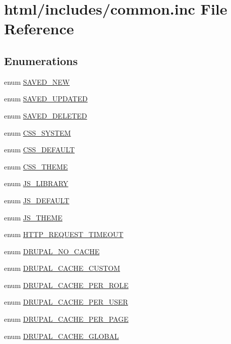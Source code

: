 \hypertarget{common_8inc}{
\section{html/includes/common.inc File Reference}
\label{common_8inc}
}
\subsection*{Enumerations}
\begin{DoxyCompactItemize}
\item 
enum \hyperlink{common_8inc_a7d54df6ca81759341e08f451d4f6c8cd}{SAVED\_\-NEW} 
\item 
enum \hyperlink{common_8inc_a7daf0b68ef3b54562e9999ef017e28cb}{SAVED\_\-UPDATED} 
\item 
enum \hyperlink{common_8inc_a38f401ae5a8d3c2f0a06307fa001fff5}{SAVED\_\-DELETED} 
\item 
enum \hyperlink{common_8inc_a4dcd70075399bbddb625fd93fa479e7f}{CSS\_\-SYSTEM} 
\item 
enum \hyperlink{common_8inc_a6b8a843e5b9b3501472dc6efef34f36b}{CSS\_\-DEFAULT} 
\item 
enum \hyperlink{common_8inc_ad9e230079d79c5c4affbd4ce0b64b7d7}{CSS\_\-THEME} 
\item 
enum \hyperlink{common_8inc_a7efeab296e4345588b1279ec758e52b3}{JS\_\-LIBRARY} 
\item 
enum \hyperlink{common_8inc_ade8dfc1503d597ba5ea4af975b0d8811}{JS\_\-DEFAULT} 
\item 
enum \hyperlink{common_8inc_a8d0998ffbec2cf7f8c2da3a80185fad2}{JS\_\-THEME} 
\item 
enum \hyperlink{common_8inc_a6b31bedd18943284b5b0c76022309167}{HTTP\_\-REQUEST\_\-TIMEOUT} 
\item 
enum \hyperlink{group__block__caching_ga49931c05c761ec8deb074dde3eb6649c}{DRUPAL\_\-NO\_\-CACHE} 
\item 
enum \hyperlink{group__block__caching_gaca17d982799dd205caa54b00e700db42}{DRUPAL\_\-CACHE\_\-CUSTOM} 
\item 
enum \hyperlink{group__block__caching_ga43d498e9607c4cdeb88d89341e0b3c3c}{DRUPAL\_\-CACHE\_\-PER\_\-ROLE} 
\item 
enum \hyperlink{group__block__caching_gaa50d399158badf0cda6ecbc3ff6707e9}{DRUPAL\_\-CACHE\_\-PER\_\-USER} 
\item 
enum \hyperlink{group__block__caching_gaf5ec7d2a686e7bf3be4cb308bdbe81cc}{DRUPAL\_\-CACHE\_\-PER\_\-PAGE} 
\item 
enum \hyperlink{group__block__caching_gae81ef75e407d08488a85f2b396292ce2}{DRUPAL\_\-CACHE\_\-GLOBAL} 
\end{DoxyCompactItemize}
